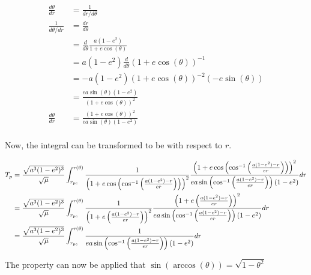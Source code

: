 \documentclass[../basicOrbitalDynamics.tex]{subfiles}
\begin{document}
\begin{align*}
    \frac{d\theta}{dr}   & = \frac{1}{dr/d\theta}                             \\
    \frac{1}{d\theta/dr} & = \frac{dr}{d\theta}                               \\
                         & =\frac{d}{d\theta}\frac{a(1-e^2)}{1+e\cos(\theta)} \\
                         & =a(1-e^2)\frac{d}{d\theta}(1+e\cos(\theta))^{-1}   \\
                         & =-a(1-e^2)(1+e\cos(\theta))^{-2}(-e\sin(\theta))   \\
                         & =\frac{ea\sin(\theta)(1-e^2)}{(1+e\cos(\theta))^2} \\
    \frac{d\theta}{dr}   & =\frac{(1+e\cos(\theta))^2}{ea\sin(\theta)(1-e^2)} \\
\end{align*}

Now, the integral can be transformed to be with respect to $r$.

\begin{align*}
    T_p & = \frac{\sqrt{a^3(1-e^2)^3}}{\sqrt{\mu}}\int_{{r}_\text{pe}}^{r(\theta)}\frac{1}{\left(1+e\cos\left(\cos^{-1}\left(\frac{a(1-e^2)-r}{er}\right)\right)\right)^2}\frac{\left(1+e\cos\left(\cos^{-1}\left(\frac{a(1-e^2)-r}{er}\right)\right)\right)^2}{ea\sin\left(\cos^{-1}\left(\frac{a(1-e^2)-r}{er}\right)\right)(1-e^2)}dr \\
        & =\frac{\sqrt{a^3(1-e^2)^3}}{\sqrt{\mu}}\int_{{r}_\text{pe}}^{r(\theta)}\frac{1}{\left(1+e\left(\frac{a(1-e^2)-r}{er}\right)\right)^2}\frac{\left(1+e\left(\frac{a(1-e^2)-r}{er}\right)\right)^2}{ea\sin\left(\cos^{-1}\left(\frac{a(1-e^2)-r}{er}\right)\right)(1-e^2)}dr                                                      \\
        & =\frac{\sqrt{a^3(1-e^2)^3}}{\sqrt{\mu}}\int_{{r}_\text{pe}}^{r(\theta)}\frac{1}{ea\sin\left(\cos^{-1}\left(\frac{a(1-e^2)-r}{er}\right)\right)(1-e^2)}dr                                                                                                                                                                       \\
\end{align*}

The property can now be applied that $\sin(\arccos(\theta))=\sqrt{1-\theta^2}$
\end{document}
